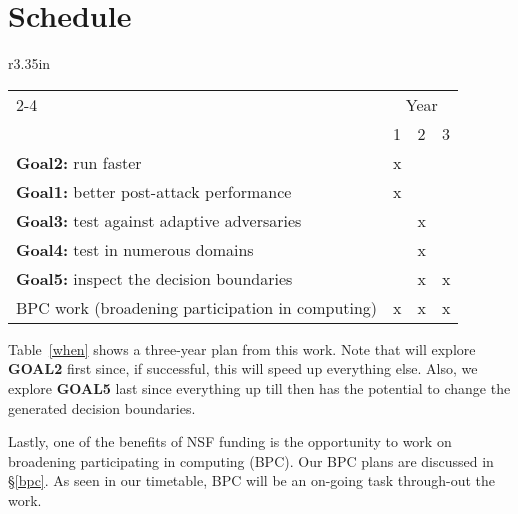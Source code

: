  
 \section{Schedule} 


 \begin{wraptable}{r}{3.35in}
{ \footnotesize
\begin{tabular}{|l|l|l|l|}\cline{2-4}    
\multicolumn{1}{c|}{~}      &\multicolumn{3}{c|}{Year} \\
\multicolumn{1}{l|}{~}       &1 & 2 & 3  \\\hline  
{\bf Goal2:} run faster                   &   x  &  &   \\\hline 
{\bf Goal1:} better post-attack performance         &    x  &       &   \\\hline 
{\bf Goal3:} test against adaptive adversaries        &      & x      &   \\\hline  
{\bf Goal4:}  test in numerous domains                &      & x     &       \\ \hline
{\bf Goal5:} inspect the decision boundaries           &      & x      &  x     \\ \hline
BPC work (broadening participation in computing)  &   x &  x    & x     \\ \hline
\end{tabular} } 
\caption{Timetable for this work. }\label{when}
\end{wraptable}
Table~\ref{when} shows a three-year plan from this work.
Note that   will explore {\bf GOAL2} first since, if successful, this will speed up everything else.
Also,  we   explore {\bf GOAL5} last since everything up till
then has the potential to change the generated decision boundaries.

Lastly, 
one  of the benefits of  NSF funding
is the opportunity to work on  broadening participating in computing (BPC).  Our BPC plans are discussed in \S\ref{bpc}. As seen
  in our timetable, BPC will be an on-going task through-out the work.

